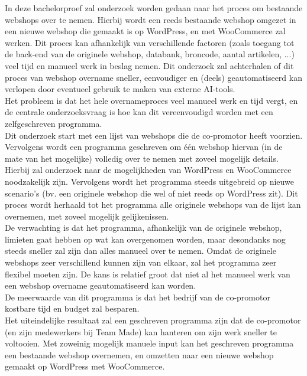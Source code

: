 \documentclass[dutch,dit,thesis]{hogentreport}
\begin{document}
In deze bachelorproef zal onderzoek worden gedaan naar het proces om bestaande webshops over te nemen. Hierbij wordt een reeds bestaande webshop omgezet in een nieuwe webshop die gemaakt is op WordPress, en met WooCommerce zal werken.
Dit proces kan afhankelijk van verschillende factoren (zoals toegang tot de back-end van de originele webshop, databank, broncode, aantal artikelen, ...) veel tijd en manueel werk in beslag nemen. Dit onderzoek zal achterhalen of dit proces van webshop overname sneller, eenvoudiger en (deels) geautomatiseerd kan verlopen door eventueel gebruik te maken van externe AI-tools.
\\
Het probleem is dat het hele overnameproces veel manueel werk en tijd vergt, en de centrale onderzoeksvraag is hoe kan dit vereenvoudigd worden met een zelfgeschreven programma.
\\ 
Dit onderzoek start met een lijst van webshops die de co-promotor heeft voorzien. 
Vervolgens wordt een programma geschreven om één webshop hiervan (in de mate van het mogelijke) volledig over te nemen met zoveel mogelijk details. Hierbij zal onderzoek naar de mogelijkheden van WordPress en WooCommerce noodzakelijk zijn.
Vervolgens wordt het programma steeds uitgebreid op nieuwe scenario's (bv. een originele webshop die wel of niet reeds op WordPress zit). Dit proces wordt herhaald tot het programma alle originele webshops van de lijst kan overnemen, met zoveel mogelijk gelijkenissen.
\\ 
De verwachting is dat het programma, afhankelijk van de originele webshop, limieten gaat hebben op wat kan overgenomen worden, maar desondanks nog steeds sneller zal zijn dan alles manueel over te nemen.
Omdat de originele webshops zeer verschillend kunnen zijn van elkaar, zal het programma zeer flexibel moeten zijn. De kans is relatief groot dat niet al het manueel werk van een webshop overname geautomatiseerd kan worden.
\\
De meerwaarde van dit programma is dat het bedrijf van de co-promotor kostbare tijd en budget zal besparen.
\\
Het uiteindelijke resultaat zal een geschreven programma zijn dat de co-promotor (en zijn medewerkers bij Team Made) kan hanteren om zijn werk sneller te voltooien. Met zoweinig mogelijk manuele input kan het geschreven programma een bestaande webshop overnemen, en omzetten naar een nieuwe webshop gemaakt op WordPress met WooCommerce.


\end{document}
